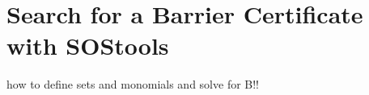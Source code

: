 %
%
%
%




\section{Search for a Barrier Certificate with SOStools}
how to define sets and monomials and solve for B!!